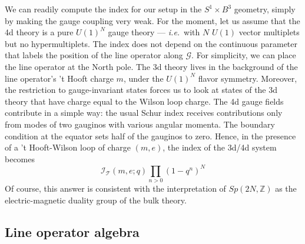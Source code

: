 \documentclass[11pt,letterpaper]{article}
\numberwithin{equation}{section}
\newcommand{\ie}{\emph{i.e.}}
\newcommand{\Z}{{\mathbb Z}}
\newcommand{\CG}{\mathcal{G}}
\newcommand{\CI}{\mathcal{I}}
\newcommand{\CT}{\mathcal{T}}
\newcommand{\q}{q}
\begin{document}
We can readily compute the index for our setup in the $S^1\times B^3$ geometry, simply by making the gauge coupling very weak. For the moment, let us assume that the 4d theory is a pure $U(1)^N$ gauge theory --- \ie\ with $N$ $U(1)$ vector multiplets but no hypermultiplets.
The index does not depend on the continuous parameter that labels the position of the line operator along $\CG$.
For simplicity, we can place the line operator at the North pole.
The 3d theory lives in the background of the line operator's 't Hooft charge $m$, under the $U(1)^N$ flavor symmetry.
Moreover, the restriction to gauge-invariant states forces us to look at states of the 3d theory that have charge equal to the Wilson loop charge.
The 4d gauge fields contribute in a simple way: the usual Schur index receives contributions only from modes of two
gauginos with various angular momenta. The boundary condition at the equator sets half of the gauginos to zero.
Hence, in the presence of a 't Hooft-Wilson loop of charge $(m,e)$, the index of the 3d/4d system becomes
\begin{equation}
\CI_\CT(m,e;\q) \prod_{n>0} (1-q^n)^N
\end{equation}
Of course, this answer is consistent with the interpretation of $Sp(2N,\Z)$ as the electric-magnetic duality group of
the bulk theory.


\subsection{Line operator algebra}
\end{document}
